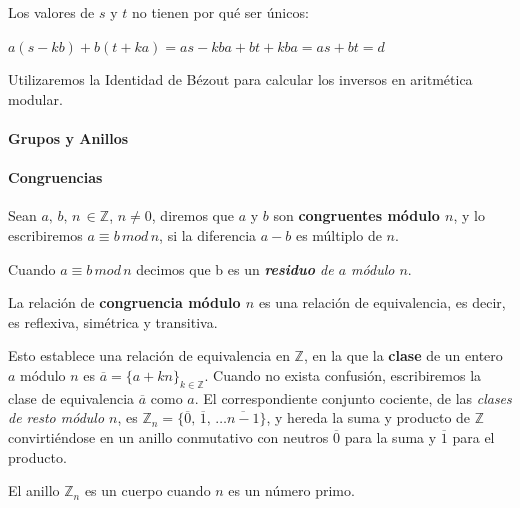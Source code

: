 \begin{remark}
	Los valores de $s$ y $t$ no tienen por qué ser únicos:
	
	${\displaystyle a(s-kb)+b(t+ka)=as-kba+bt+kba=as+bt = d}$
\end{remark}

\hfil

Utilizaremos la Identidad de Bézout para calcular los inversos en aritmética modular.

\hfil

\paragraph{Grupos y Anillos}


\paragraph{Congruencias}

\begin{definition}
	Sean $a,\,b,\,n\,\in \mathbb{Z}$, $n \neq 0$, diremos que $a$ y $b$ son \textbf{congruentes módulo $n$}, y lo escribiremos $a \equiv b \, mod \, n$, si la diferencia $a - b$ es múltiplo de $n$.
\end{definition}

Cuando $a \equiv b \, mod \, n$ decimos que b es un \textit{\textbf{residuo} de $a$ módulo $n$}.

\begin{proposition}
	La relación de \textbf{congruencia módulo $n$} es una relación de equivalencia, es decir, es reflexiva, simétrica y transitiva.
\end{proposition}

Esto establece una relación de equivalencia en $\mathbb{Z}$, en la que la \textbf{clase} de un entero $a$ módulo $n$ es $\overline{a} = \{ a + kn \}_{k \in \mathbb{Z}}$. Cuando no exista confusión, escribiremos la clase de equivalencia $\overline{a}$ como $a$.
El correspondiente conjunto cociente, de las \textit{clases de resto módulo $n$}, es $\mathbb{Z}_n = \{\overline{0},\,\overline{1},\,\dots\overline{n-1}\}$, y hereda la suma y producto de $\mathbb{Z}$ convirtiéndose en un anillo conmutativo con neutros $\overline{0}$ para la suma y $\overline{1}$ para el producto.


\begin{theorem}
	El anillo $\mathbb{Z}_n$ es un cuerpo cuando $n$ es un número primo.
\end{theorem}

